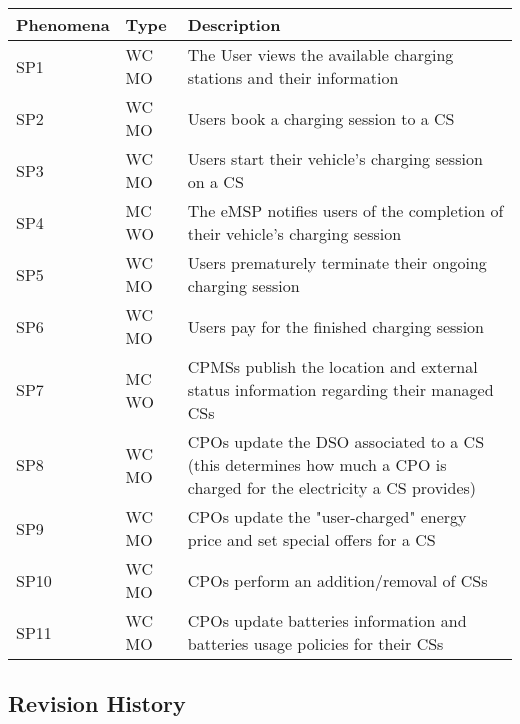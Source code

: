 \documentclass[11pt]{article}
\begin{document}
\begin{table}[H]
    \centering
    \setlength{\tabcolsep}{18pt}
    \renewcommand{\arraystretch}{1.2}
    \begin{tabularx}{\textwidth}{|>{\centering\hsize=0.3\hsize}X|>{\centering\hsize=0.3\hsize}X|>{\hsize=1.4\hsize}X|}
        \hline
        \textbf{Phenomena} & \textbf{Type} & \textbf{Description} \\
        \hline
        SP1 & WC MO & The User views the available charging stations and their information \\
        \hline
        SP2 & WC MO & Users book a charging session to a CS \\
        \hline
        SP3 & WC MO & Users start their vehicle's charging session on a CS \\
        \hline
        SP4 & MC WO & The eMSP notifies users of the completion of their vehicle's charging session \\
        \hline
        SP5 & WC MO & Users prematurely terminate their ongoing charging session \\
        \hline
        SP6 & WC MO & Users pay for the finished charging session \\
        \hline
        SP7 & MC WO & CPMSs publish the location and external status information regarding their managed CSs \\
        \hline
        SP8 & WC MO & CPOs update the DSO associated to a CS (this determines how much a CPO is charged for the electricity a CS provides) \\
        \hline
        SP9 & WC MO & CPOs update the "user-charged" energy price and set special offers for a CS \\
        \hline
        SP10 & WC MO & CPOs perform an addition/removal of CSs \\
        \hline
        SP11 & WC MO & CPOs update batteries information and batteries usage policies for their CSs \\
        \hline
    \end{tabularx}
    \label{tab:shared_phenomena}
\end{table}

\subsection{Revision History}
\end{document}
